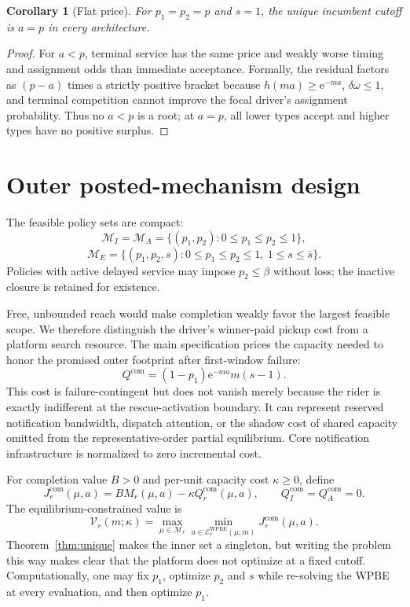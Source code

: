 \documentclass[11pt]{article}
\newtheorem{corollary}[theorem]{Corollary}
\theoremstyle{definition}
\theoremstyle{remark}
\newcommand{\cE}{\mathcal E}
\newcommand{\cM}{\mathcal M}
\newcommand{\e}{\mathrm e}
\newcommand{\com}{\mathrm{com}}
\begin{document}
\begin{corollary}[Flat price]
\label{cor:flat}
For $p_1=p_2=p$ and $s=1$, the unique incumbent cutoff is $a=p$ in every
architecture.
\end{corollary}

\begin{proof}
For $a<p$, terminal service has the same price and weakly worse timing and
assignment odds than immediate acceptance.  Formally, the residual factors as
$(p-a)$ times a strictly positive bracket because $h(ma)\ge\e^{-ma}$,
$\delta\omega\le1$, and terminal competition cannot improve the focal
driver's assignment probability.  Thus no $a<p$ is a root; at $a=p$, all
lower types accept and higher types have no positive surplus.
\end{proof}

\section{Outer posted-mechanism design}

The feasible policy sets are compact:
\[
\cM_I=\cM_A=\{(p_1,p_2):0\le p_1\le p_2\le1\},
\]
\[
\cM_E=\{(p_1,p_2,s):0\le p_1\le p_2\le1,
\ 1\le s\le\bar s\}.
\]
Policies with active delayed service may impose $p_2\le\beta$ without loss;
the inactive closure is retained for existence.

Free, unbounded reach would make completion weakly favor the largest feasible
scope.  We therefore distinguish the driver's winner-paid pickup cost from a
platform search resource.  The main specification prices the capacity needed
to honor the promised outer footprint after first-window failure:
\begin{equation}
Q^{\com}=(1-p_1)\e^{-ma}m(s-1).
\label{eq:qcom}
\end{equation}
This cost is failure-contingent but does not vanish merely because the rider is
exactly indifferent at the rescue-activation boundary.  It can represent
reserved notification bandwidth, dispatch attention, or the shadow cost of
shared capacity omitted from the representative-order partial equilibrium.
Core notification infrastructure is normalized to zero incremental cost.

For completion value $B>0$ and per-unit capacity cost $\kappa\ge0$, define
\[
J_r^{\com}(\mu,a)=BM_r(\mu,a)-\kappa Q_r^{\com}(\mu,a),
\qquad Q_I^{\com}=Q_A^{\com}=0.
\]
The equilibrium-constrained value is
\begin{equation}
\mathcal V_r(m;\kappa)
=\max_{\mu\in\cM_r}
\min_{a\in\cE_r^{\mathrm{WPBE}}(\mu;m)}J_r^{\com}(\mu,a).
\label{eq:outer}
\end{equation}
Theorem~\ref{thm:unique} makes the inner set a singleton, but writing the
problem this way makes clear that the platform does not optimize at a fixed
cutoff.  Computationally, one may fix $p_1$, optimize $p_2$ and $s$ while
re-solving the WPBE at every evaluation, and then optimize $p_1$.
\end{document}
